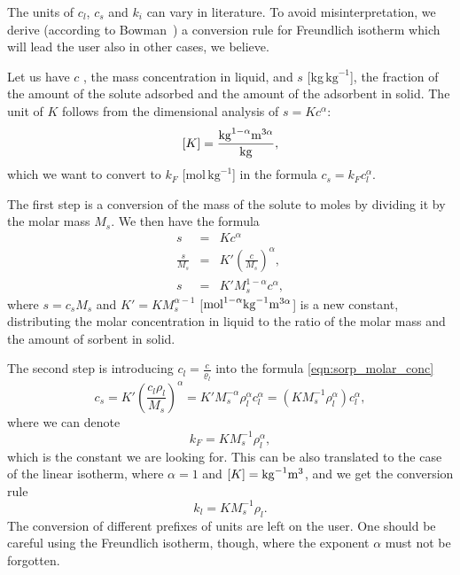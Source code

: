 The units of $c_l$, $c_s$ and $k_i$ can vary in literature. To avoid misinterpretation, we derive (according
to Bowman~\cite{bowman_conversion_1982}) a conversion rule for Freundlich isotherm which will lead the user 
also in other cases, we believe. 

Let us have $c$ , the mass concentration in liquid, and $s$ [kg\,$\mathrm{kg}^{-1}$], 
the fraction of the amount of the solute adsorbed and the amount of the adsorbent in solid. 
The unit of $K$ follows from the dimensional analysis of $s=Kc^{\alpha}$:
\[[K] = \frac{\rm{kg}^{1-\alpha}\rm{m}^{3\alpha}}{\rm{kg}},\]
which we want to convert to $k_F$ [mol\,$\mathrm{kg}^{-1}$] in the formula $c_s=k_Fc_l^\alpha$.

The first step is a conversion of the mass of the solute to moles by dividing it by the
molar mass $M_s$. We then have the formula 
\begin{eqnarray}
s&=&Kc^{\alpha} \nonumber \\
\frac{s}{M_s} &=& K'\left(\frac{c}{M_s}\right)^\alpha, \label{eqn:sorp_molar_conc}\\
s &=& K'M_s^{1-\alpha}c^\alpha, \nonumber 
\end{eqnarray}
where $s=c_sM_s$ and $K'=KM_s^{\alpha-1}$ [$\rm{mol}^{1-\alpha}\rm{kg}^{-1}\rm{m}^{3\alpha}$] is a new constant,
distributing the molar concentration in liquid to the ratio of the molar mass and the amount of sorbent in solid.

The second step is introducing $c_l = \frac{c}{\varrho_l}$ into the formula \eqref{eqn:sorp_molar_conc}
\begin{equation}
c_s = K'\left(\frac{c_l \rho_l }{M_s}\right)^\alpha
= K' M_s^{-\alpha}\rho_l^{\alpha}c_l^\alpha 
= \left( K M_s^{-1}\rho_l^{\alpha} \right) c_l^\alpha,
\end{equation}
where we can denote 
\begin{equation}
k_F=K M_s^{-1}\rho_l^{\alpha},
\end{equation} 
which is the constant we are looking for. This can be also translated to the case of the linear isotherm, where
$\alpha=1$ and $[K] = \rm{kg}^{-1}\rm{m}^{3}$, and we get the conversion rule
\begin{equation}
k_l=K M_s^{-1}\rho_l.
\end{equation} 
The conversion of different prefixes of units are left on the user. One should be careful using the 
Freundlich isotherm, though, where the exponent $\alpha$ must not be forgotten.

